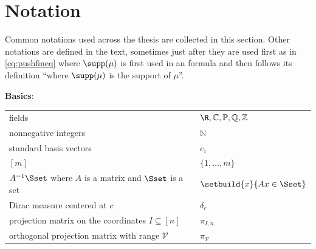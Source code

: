 \documentclass[11pt,twoside,a4paper,openright]{uclouvain-thesis}
\newenvironment{notationlist}[1]
{\vspace{1em}

\noindent
\textbf{#1}:


\begin{longtable}{p{0.5\textwidth}p{0.48\textwidth}}}
{\end{longtable}}
\newcommand{\clearemptydoublepage}{%
	\newpage{\pagestyle{empty}\cleardoublepage}}
\begin{document}


\frontmatter
\clearemptydoublepage


\clearemptydoublepage


\clearemptydoublepage

\tableofcontents
\clearemptydoublepage

\mainmatter


\section*{Notation}


Common notations used across the thesis are collected in this section.
Other notations are defined in the text, sometimes just after they are used first as in
\eqref{eq:pushfineq} where $\supp(\mu)$ is first used in an formula and then
follows its definition ``where $\supp(\mu)$ is the support of $\mu$''.

\begin{notationlist}{Basics}
  fields & $\R, \mathbb{C}, \mathbb{P}, \mathbb{Q}, \mathbb{Z}$\\
  nonnegative integers & $\mathbb{N}$\\
  standard basis vectors & $e_i$\\
  $[m]$ & $\{1, \ldots, m\}$\\
  $A^{-1}\Sset$ where $A$ is a matrix and $\Sset$ is a set & $\setbuild{x}{Ax \in \Sset}$\\
  Dirac measure centered at $c$ & $\delta_{c}$\\
  projection matrix on the coordinates $I \subseteq [n]$ & $\pi_{I, n}$\\
  orthogonal projection matrix with range $\mathcal{V}$ & $\pi_{\mathcal{V}}$\\
\end{notationlist}
\end{document}
